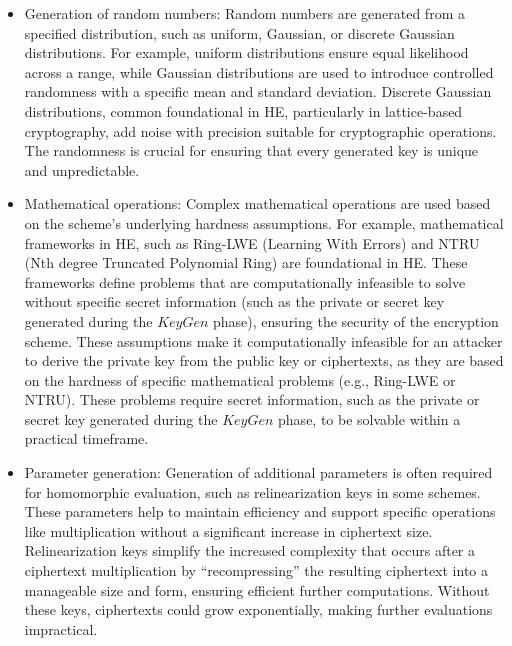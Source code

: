 \documentclass[
  letterpaper,
  DIV=11,
  numbers=noendperiod,
  oneside]{scrartcl}
\begin{document}
\begin{itemize}
\begin{itemize}
    \begin{itemize}
    \item
      Generation of random numbers: Random numbers are generated from a
      specified distribution, such as uniform, Gaussian, or discrete
      Gaussian distributions. For example, uniform distributions ensure
      equal likelihood across a range, while Gaussian distributions are
      used to introduce controlled randomness with a specific mean and
      standard deviation. Discrete Gaussian distributions, common
      foundational in HE, particularly in lattice-based cryptography,
      add noise with precision suitable for cryptographic operations.
      The randomness is crucial for ensuring that every generated key is
      unique and unpredictable.
    \item
      Mathematical operations: Complex mathematical operations are used
      based on the scheme's underlying hardness assumptions. For
      example, mathematical frameworks in HE, such as Ring-LWE (Learning
      With Errors) and NTRU (Nth degree Truncated Polynomial Ring) are
      foundational in HE. These frameworks define problems that are
      computationally infeasible to solve without specific secret
      information (such as the private or secret key generated during
      the \(KeyGen\) phase), ensuring the security of the encryption
      scheme. These assumptions make it computationally infeasible for
      an attacker to derive the private key from the public key or
      ciphertexts, as they are based on the hardness of specific
      mathematical problems (e.g., Ring-LWE or NTRU). These problems
      require secret information, such as the private or secret key
      generated during the \(KeyGen\) phase, to be solvable within a
      practical timeframe.
    \item
      Parameter generation: Generation of additional parameters is often
      required for homomorphic evaluation, such as relinearization keys
      in some schemes. These parameters help to maintain efficiency and
      support specific operations like multiplication without a
      significant increase in ciphertext size. Relinearization keys
      simplify the increased complexity that occurs after a ciphertext
      multiplication by ``recompressing'' the resulting ciphertext into
      a manageable size and form, ensuring efficient further
      computations. Without these keys, ciphertexts could grow
      exponentially, making further evaluations impractical.
    \end{itemize}
  \end{itemize}


\end{itemize}
\end{document}
